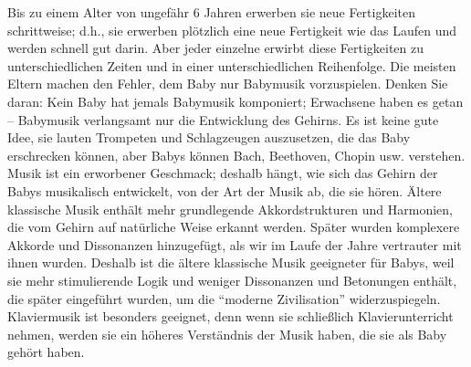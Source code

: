 Bis zu einem Alter von ungefähr 6 Jahren erwerben sie neue Fertigkeiten schrittweise; d.h., sie erwerben plötzlich eine neue Fertigkeit wie das Laufen und werden schnell gut darin.
Aber jeder einzelne erwirbt diese Fertigkeiten zu unterschiedlichen Zeiten und in einer unterschiedlichen Reihenfolge.
Die meisten Eltern machen den Fehler, dem Baby nur Babymusik vorzuspielen.
Denken Sie daran: Kein Baby hat jemals Babymusik komponiert; Erwachsene haben es getan -- Babymusik verlangsamt nur die Entwicklung des Gehirns.
Es ist keine gute Idee, sie lauten Trompeten und Schlagzeugen auszusetzen, die das Baby erschrecken können, aber Babys können Bach, Beethoven, Chopin usw. verstehen.
Musik ist ein erworbener Geschmack; deshalb hängt, wie sich das Gehirn der Babys musikalisch entwickelt, von der Art der Musik ab, die sie hören.
Ältere klassische Musik enthält mehr grundlegende Akkordstrukturen und Harmonien, die vom Gehirn auf natürliche Weise erkannt werden.
Später wurden komplexere Akkorde und Dissonanzen hinzugefügt, als wir im Laufe der Jahre vertrauter mit ihnen wurden.
Deshalb ist die ältere klassische Musik geeigneter für Babys, weil sie mehr stimulierende Logik und weniger Dissonanzen und Betonungen enthält, die später eingeführt wurden, um die \enquote{moderne Zivilisation} widerzuspiegeln.
Klaviermusik ist besonders geeignet, denn wenn sie schließlich Klavierunterricht nehmen, werden sie ein höheres Verständnis der Musik haben, die sie als Baby gehört haben.


\label{c1iii18c3}

